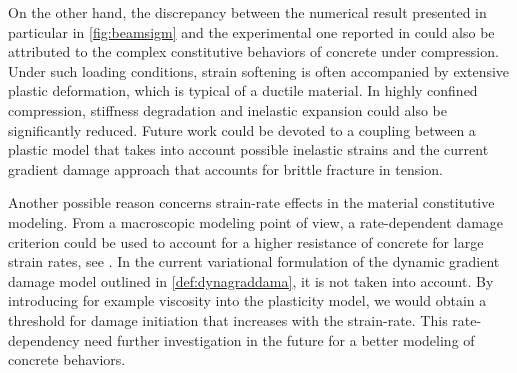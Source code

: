 On the other hand, the discrepancy between the numerical result presented in particular in \cref{fig:beamsigm} and the experimental one reported in \cite{Guilbaud:2015} could also be attributed to the complex constitutive behaviors of concrete under compression. Under such loading conditions, strain softening is often accompanied by extensive plastic deformation, which is typical of a ductile material. In highly confined compression, stiffness degradation and inelastic expansion could also be significantly reduced. Future work could be devoted to a coupling between a plastic model that takes into account possible inelastic strains and the current gradient damage approach that accounts for brittle fracture in tension.

Another possible reason concerns strain-rate effects in the material constitutive modeling. From a macroscopic modeling point of view, a rate-dependent damage criterion could be used to account for a higher resistance of concrete for large strain rates, see \cite{Hentz:2003}. In the current variational formulation of the dynamic gradient damage model outlined in \cref{def:dynagraddama}, it is not taken into account. By introducing for example viscosity into the plasticity model, we would obtain a threshold for damage initiation that increases with the strain-rate. This rate-dependency need further investigation in the future for a better modeling of concrete behaviors.